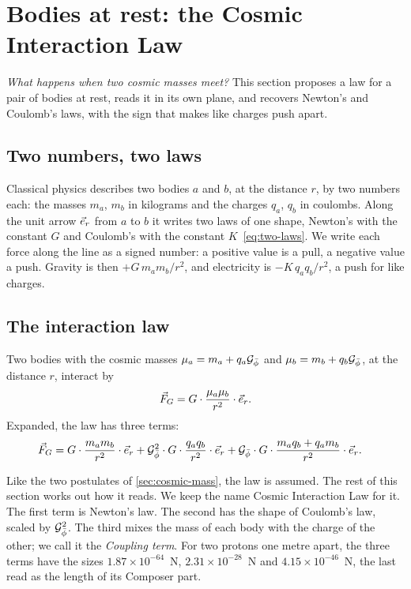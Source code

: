 \section{Bodies at rest: the Cosmic Interaction Law}\label{sec:rest}

\emph{What happens when two cosmic masses meet?} This section proposes a law for a pair of bodies at rest, reads it in its own plane, and recovers Newton's and Coulomb's laws, with the sign that makes like charges push apart.

\subsection{Two numbers, two laws}\label{subsec:two-numbers}

Classical physics describes two bodies $a$ and $b$, at the distance $r$, by two numbers each: the masses $m_a$, $m_b$ in kilograms and the charges $q_a$, $q_b$ in coulombs. Along the unit arrow $\vec{e}_{r}$ from $a$ to $b$ it writes two laws of one shape, Newton's with the constant $G$ and Coulomb's with the constant $K$~\cref{eq:two-laws}. We write each force along the line as a signed number: a positive value is a pull, a negative value a push. Gravity is then $+G\,m_a m_b/r^2$, and electricity is $-K\,q_a q_b/r^2$, a push for like charges.

\subsection{The interaction law}\label{subsec:one-law}

\begin{postulate}\label{law:interaction}
Two bodies with the cosmic masses $\mu_a = m_a + q_a\mathcal{G}_{\bar{\phi}}$ and $\mu_b = m_b + q_b\mathcal{G}_{\bar{\phi}}$, at the distance $r$, interact by
\[
\vec{F}_G = G\cdot\frac{\mu_a\mu_b}{r^2}\cdot\vec{e}_{r} .
\]
Expanded, the law has three terms:
\begin{align*}
\vec{F}_G &= G\cdot\frac{m_a m_b}{r^2}\cdot\vec{e}_{r}
 + \mathcal{G}_{\bar{\phi}}^2\cdot G\cdot\frac{q_a q_b}{r^2}\cdot\vec{e}_{r}
 + \mathcal{G}_{\bar{\phi}}\cdot G\cdot\frac{m_a q_b + q_a m_b}{r^2}\cdot\vec{e}_{r} .
\end{align*}
\end{postulate}

Like the two postulates of \cref{sec:cosmic-mass}, the law is assumed. The rest of this section works out how it reads. We keep the name Cosmic Interaction Law for it. The first term is Newton's law. The second has the shape of Coulomb's law, scaled by $\mathcal{G}_{\bar{\phi}}^2$. The third mixes the mass of each body with the charge of the other; we call it the \emph{Coupling term}. For two protons one metre apart, the three terms have the sizes $1.87 \times 10^{-64}$~N, $2.31 \times 10^{-28}$~N and $4.15 \times 10^{-46}$~N, the last read as the length of its Composer part.

